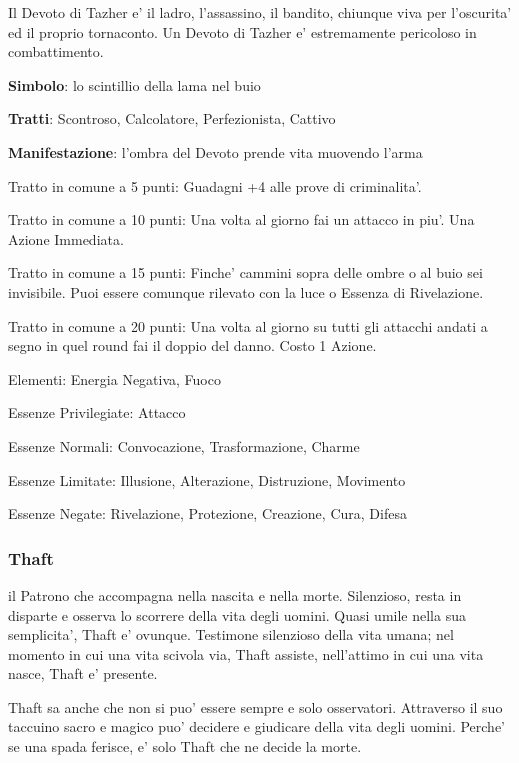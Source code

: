 \documentclass[a4paper,11pt,twoside,openany]{dndbook}
\begin{document}
{Il Devoto di Tazher e' il ladro, l'assassino, il bandito, chiunque viva per l'oscurita' ed il proprio tornaconto. Un Devoto di Tazher e' estremamente pericoloso in combattimento.

\textbf{Simbolo}: lo scintillio della lama nel buio

\textbf{Tratti}: Scontroso, Calcolatore, Perfezionista, Cattivo

\textbf{Manifestazione}: l'ombra del Devoto prende vita muovendo l'arma

\bigskip

Tratto in comune a 5 punti: Guadagni +4 alle prove di criminalita'.

Tratto in comune a 10 punti: Una volta al giorno fai un attacco in piu'. Una Azione Immediata.

Tratto in comune a 15 punti: Finche' cammini sopra delle ombre o al buio sei invisibile. Puoi essere comunque rilevato con la luce o Essenza di Rivelazione.

Tratto in comune a 20 punti: Una volta al giorno su tutti gli attacchi andati a segno in quel round fai il doppio del danno. Costo 1 Azione.

\bigskip

Elementi: Energia Negativa, Fuoco

\bigskip

Essenze Privilegiate: Attacco

Essenze Normali: Convocazione, Trasformazione, Charme

Essenze Limitate: Illusione, Alterazione, Distruzione, Movimento

Essenze Negate: Rivelazione, Protezione, Creazione, Cura, Difesa

\subsubsection{Thaft}

\label{thaft}

il Patrono che accompagna nella nascita e nella morte. Silenzioso, resta in disparte e osserva lo scorrere della vita degli uomini. Quasi umile nella sua semplicita', Thaft e' ovunque. Testimone silenzioso della vita umana; nel momento in cui una vita scivola via, Thaft assiste, nell'attimo in cui una vita nasce, Thaft e' presente.

Thaft sa anche che non si puo' essere sempre e solo osservatori. Attraverso il suo taccuino sacro e magico puo' decidere e giudicare della vita degli uomini. Perche' se una spada ferisce, e' solo Thaft che ne decide la morte.

}
\end{document}
